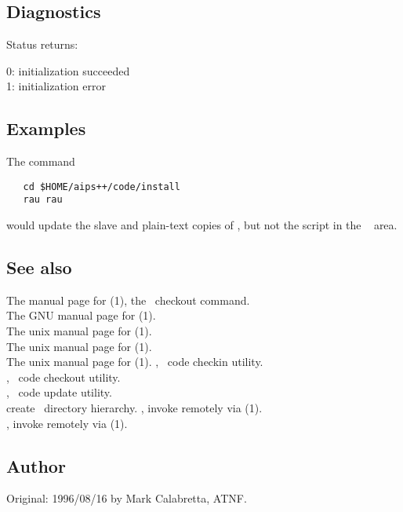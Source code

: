 \subsection*{Diagnostics}
 
Status returns:
\begin{status}
   0:  initialization succeeded\\
   1:  initialization error
\end{status}
 
\subsection*{Examples}
 
The command
 
\begin{verbatim}
   cd $HOME/aips++/code/install
   rau rau
\end{verbatim}
 
\noindent
would update the slave and plain-text copies of , but not the script
in the \aipspp\  area.

\subsection*{See also}

The manual page for (1), the \rcs\ checkout command.\\
The GNU manual page for (1).\\
The unix manual page for (1).\\
The unix manual page for (1).\\
The unix manual page for (1).
, \aipspp\ code checkin utility.\\
, \aipspp\ code checkout utility.\\
, \aipspp\ code update utility.\\
 create \aipspp\ directory hierarchy.
, invoke  remotely via (1).\\
, invoke  remotely via (1).
 
\subsection*{Author}

Original: 1996/08/16 by Mark Calabretta, ATNF.

 
